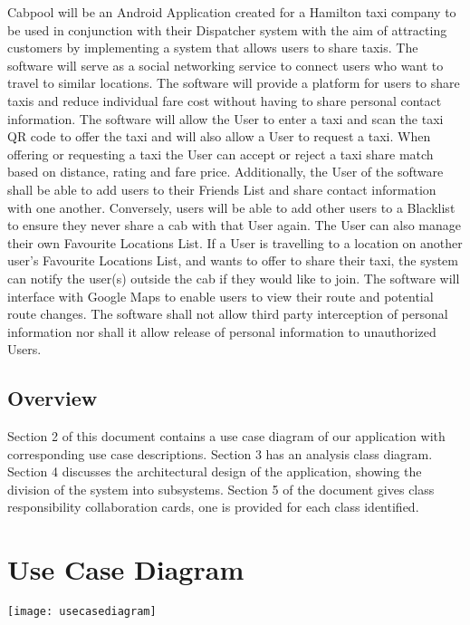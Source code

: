 \documentclass[english]{article}
\begin{document}
Cabpool will be an Android Application created for a Hamilton taxi company to be used in conjunction with their Dispatcher system with the aim of attracting customers by implementing a system that allows users to share taxis. The software will serve as a social networking service to connect users who want to travel to similar locations. The software will provide a platform for users to share taxis and reduce individual fare cost without having to share personal contact information. The software will allow the User to enter a taxi and scan the taxi QR code to offer the taxi and will also allow a User to request a taxi. When offering or requesting a taxi the User can accept or reject a taxi share match based on distance, rating and fare price. \newline
\newline
Additionally, the User of the software shall be able to add users to their Friends List and share contact information with one another. Conversely, users will be able to add other users to a Blacklist to ensure they never share a cab with that User again. The User can also manage their own Favourite Locations List. If a User is travelling to a location on another user's Favourite Locations List, and wants to offer to share their taxi, the system can notify the user(s) outside the cab if they would like to join. The software will interface with Google Maps to enable users to view their route and potential route changes. The software shall not allow third party interception of personal information nor shall it allow release of personal information to unauthorized Users.

\subsection{Overview}
\label{sub:overview}
Section 2 of this document contains a use case diagram of our application with corresponding use case descriptions. Section 3 has an analysis class diagram. Section 4 discusses the architectural design of the application, showing the division of the system into subsystems. Section 5 of the document gives class responsibility collaboration cards, one is provided for each class identified. 



\section{Use Case Diagram}
\label{sec:use_case_diagram}
\texttt{[image: usecasediagram]}
\label{fig:my_label}
\end{document}
